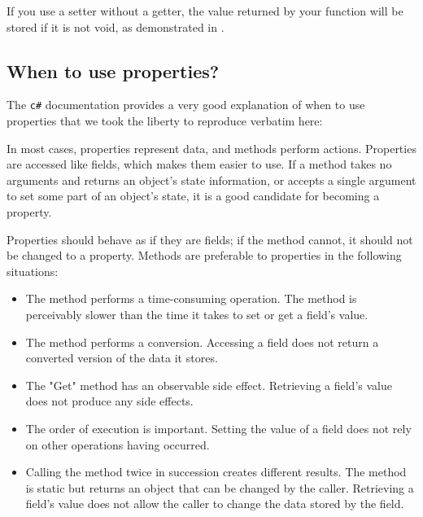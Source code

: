 If you use a setter without a getter, the value returned by your function
will be stored if it is not void, as demonstrated in
.

\subsection{When to use properties?}

The \lstinline{c#} documentation provides a very good explanation of when to use
properties that we took the liberty to reproduce verbatim here:

In most cases, properties represent data, and methods perform actions.
Properties are accessed like fields, which makes them easier to use.
If a method takes no arguments and returns an object's state information,
or accepts a single argument to set some part of an object's state,
it is a good candidate for becoming a property.

Properties should behave as if they are fields; if the method cannot,
it should not be changed to a property.
Methods are preferable to properties in the following situations:

\begin{itemize}
\item The method performs a time-consuming operation. The method is perceivably slower than the time it takes to set or get a field's value.
\item The method performs a conversion. Accessing a field does not return a converted version of the data it stores.
\item The "Get" method has an observable side effect. Retrieving a field's value does not produce any side effects.
\item The order of execution is important. Setting the value of a field does not rely on other operations having occurred.
\item Calling the method twice in succession creates different results.
The method is static but returns an object that can be changed by the caller. Retrieving a field's value does not allow the caller to change the data stored by the field.

\end{itemize}
